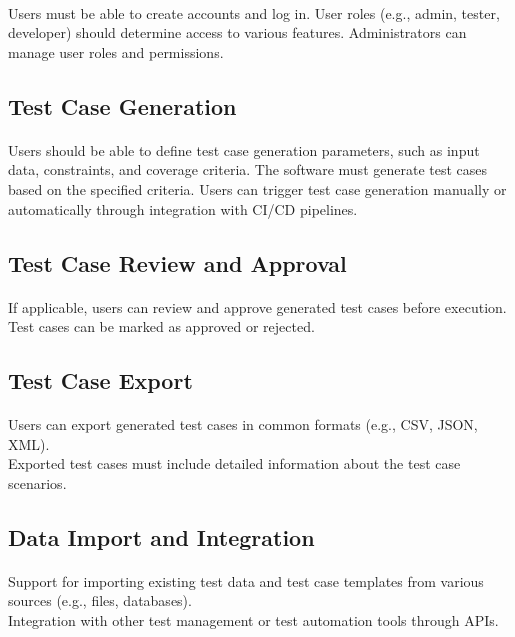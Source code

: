 \documentclass{article}
\begin{document}
\paragraph{}
Users must be able to create accounts and log in.
User roles (e.g., admin, tester, developer) should determine access to various features.
Administrators can manage user roles and permissions.

\subsection{Test Case Generation}
\paragraph{}
Users should be able to define test case generation parameters, such as input data,
constraints, and coverage criteria. The software must generate test cases based on the
specified criteria. Users can trigger test case generation manually or automatically
through integration with CI/CD pipelines.

\subsection{Test Case Review and Approval}
\paragraph{}
If applicable, users can review and approve generated test cases before execution.\\
Test cases can be marked as approved or rejected.

\subsection{Test Case Export}
\paragraph{}
Users can export generated test cases in common formats (e.g., CSV, JSON, XML).\\
Exported test cases must include detailed information about the test case scenarios.

\subsection{Data Import and Integration}
\paragraph{}
Support for importing existing test data and test case templates from various sources (e.g., files, databases).\\
Integration with other test management or test automation tools through APIs.
\end{document}
